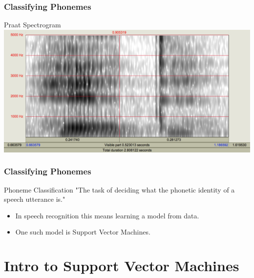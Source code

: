 \documentclass{beamer}
\begin{document}

\begin{frame}
\frametitle{Classifying Phonemes}
\begin{block}{Praat Spectrogram}
\includegraphics[scale=.28]{../figures/hid-spectrogram.png}
\end{block}
\end{frame}


\begin{frame}
\frametitle{Classifying Phonemes}
\begin{block}{Phoneme Classification}
"The task of deciding what the phonetic identity of a speech utterance is." \cite{p1}
\end{block}
\begin{itemize}
\item In speech recognition this means learning a model from data.
\item One such model is Support Vector Machines. 
\end{itemize}
\end{frame}


\section{Intro to Support Vector Machines}

\end{document}
